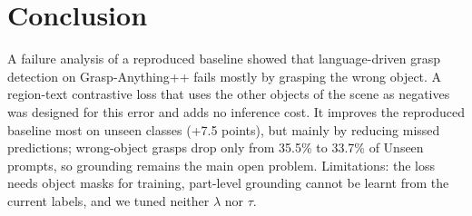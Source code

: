 \section{Conclusion}
\label{sec:conclusion}

A failure analysis of a reproduced baseline showed that language-driven grasp detection on Grasp-Anything++ fails mostly by grasping the wrong object.
A region-text contrastive loss that uses the other objects of the scene as negatives was designed for this error and adds no inference cost.
It improves the reproduced baseline most on unseen classes (+7.5 points), but mainly by reducing missed predictions; wrong-object grasps drop only from 35.5\% to 33.7\% of Unseen prompts, so grounding remains the main open problem.
Limitations: the loss needs object masks for training, part-level grounding cannot be learnt from the current labels, and we tuned neither $\lambda$ nor $\tau$.
